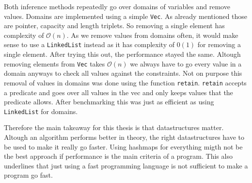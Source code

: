 Both inference methods repeatedly go over domains of variables and remove values. Domains are implemented using a simple \verb|Vec|. As already mentioned those are pointer, capacity and length triplets. So removing a single element has complexity of $\mathcal{O}(n)$. As we remove values from domains often, it would make sense to use a \verb|LinkedList| instead as it has complexity of $\mathcal{0}(1)$ for removing a single element. After trying this out, the performance stayed the same. Altough removing elements from \verb|Vec| takes $\mathcal{O}(n)$ we always have to go every value in a domain anyways to check all values against the constraints. Not on purpose this removal of values in domains was done using the function \verb|retain|. \verb|retain| accepts a predicate and goes over all values in the vec and only keeps values that the predicate allows. After benchmarking this was just as efficient as using \verb|LinkedList| for domains.

Therefore the main takeaway for this thesis is that datastructures matter. Altough an algorithm performs better in theory, the right datastructures have to be used to make it really go faster. Using hashmaps for everything migth not be the best approach if performance is the main criteria of a program. This also underlines that just using a fast programming language is not sufficient to make a program go fast.

